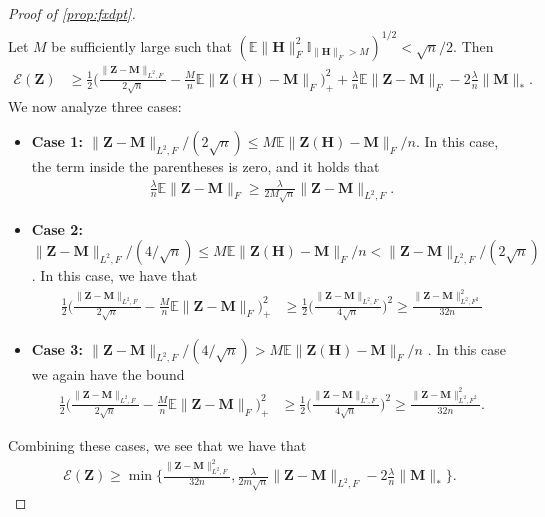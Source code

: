 \documentclass[10pt]{article}
\theoremstyle{definition}
\begin{document}
\begin{proof}[Proof of \cref{prop:fxdpt}]
\begin{align}
\end{align}
Let $M$ be sufficiently large such that $(\mathbb{E} \| \bm{H} \|_F^2 \mathbb{I}_{\| \bm{H} \|_F > M} )^{1/2} < \sqrt{n}/2.$  Then
\begin{align}
    \mathcal{E}(\bm{Z}) &\geq \frac{1}{2} \bigg( \frac{\| \bm{Z} - \bm{M} \|_{L^2,F}}{2\sqrt{n}} - \frac{M}{n} \mathbb{E} \| \bm{Z}(\bm{H}) - \bm{M}\|_F \bigg)^2_+ +\frac{\lambda}{n} \mathbb{E} \| \bm{Z} - \bm{M} \|_F - 2\frac{\lambda}{n}\| \bm{M} \|_*.
\end{align}
We now analyze three cases:
\begin{itemize}
    \item \textbf{Case 1: $\|\bm{Z} - \bm{M} \|_{L^2,F}/(2\sqrt{n}) \leq M \mathbb{E} \| \bm{Z}(\bm{H}) - \bm{M} \|_F/n$}.  In this case, the term inside the parentheses is zero, and it holds that
    \begin{align}
        \frac{\lambda}{n} \mathbb{E} \| \bm{Z} - \bm{M} \|_F \geq \frac{\lambda}{2 M \sqrt{n}} \| \bm{Z} - \bm{M} \|_{L^2,F}.
    \end{align}
    \item \textbf{Case 2: $\| \bm{Z} - \bm{M} \|_{L^2,F}/(4/\sqrt{n}) \leq M\mathbb{E} \| \bm{Z}(\bm{H}) - \bm{M} \|_F/n <  \|\bm{Z} - \bm{M} \|_{L^2,F}/(2\sqrt{n})$}. In this case, we have that
    \begin{align}
        \frac{1}{2} \bigg( \frac{\|\bm{Z} - \bm{M} \|_{L^2,F}}{2\sqrt{n}} - \frac{M}{n} \mathbb{E} \| \bm{Z} - \bm{M} \|_F \bigg)^2_+ &\geq \frac{1}{2} \bigg( \frac{\|\bm{Z} - \bm{M}\|_{L^2,F}}{4 \sqrt{n}} \bigg)^2 \geq \frac{\|\bm{Z} - \bm{M}\|_{L^2,F^2}^2}{32 n}
    \end{align}
    \item \textbf{Case 3: $\| \bm{Z} - \bm{M} \|_{L^2,F}/(4/\sqrt{n}) >  M\mathbb{E} \| \bm{Z}(\bm{H}) - \bm{M} \|_F/n$ }.  In this case we again have the bound 
      \begin{align}
        \frac{1}{2} \bigg( \frac{\|\bm{Z} - \bm{M} \|_{L^2,F}}{2\sqrt{n}} - \frac{M}{n} \mathbb{E} \| \bm{Z} - \bm{M} \|_F \bigg)^2_+ &\geq \frac{1}{2} \bigg( \frac{\|\bm{Z} - \bm{M}\|_{L^2,F}}{4 \sqrt{n}} \bigg)^2 \geq \frac{\|\bm{Z} - \bm{M}\|_{L^2,F^2}^2}{32 n}.
    \end{align}
\end{itemize}
Combining these cases, we see that we have that
\begin{align}
    \mathcal{E}(\bm{Z}) \geq \min\bigg\{ \frac{\|\bm{Z} - \bm{M}\|_{L^2,F}^2}{32n}, \frac{\lambda}{2m \sqrt{n}} \| \bm{Z} - \bm{M} \|_{L^2,F} - 2 \frac{\lambda}{n} \| \bm{M}\|_* \bigg\}.

\end{align}
\end{proof}
\end{document}
